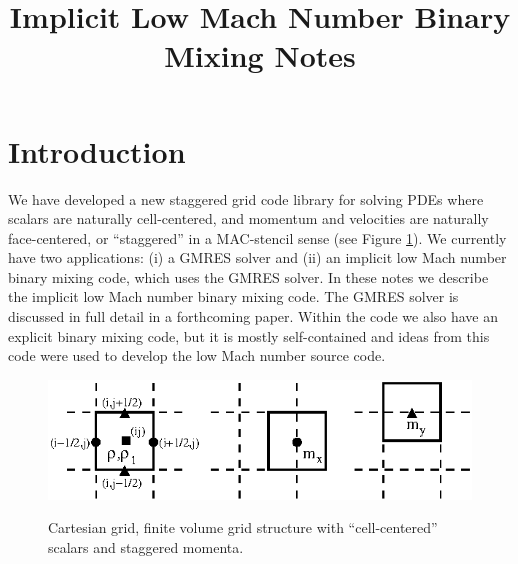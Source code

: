 \documentclass[final]{siamltex}
\begin{document}
\title{Implicit Low Mach Number Binary Mixing Notes}

\maketitle

\section{Introduction}
We have developed a new staggered grid code library for solving PDEs where scalars
are naturally cell-centered, and momentum and velocities are naturally face-centered,
or ``staggered'' in a MAC-stencil sense (see Figure \ref{fig:grid}).  We currently
have two applications: (i) a GMRES solver and (ii) an implicit low Mach number binary 
mixing code, which uses the GMRES solver.  In these notes we describe the implicit
low Mach number binary mixing code.  The GMRES solver is discussed in full detail 
in a forthcoming paper.  Within the code we also have an explicit binary mixing code,
but it is mostly self-contained and ideas from this code were used to develop the
low Mach number source code.
\begin{figure}[hb]
\centering
\includegraphics[width=5in]{grid}
\label{fig:grid}
\caption{Cartesian grid, finite volume grid structure with ``cell-centered'' scalars
and staggered momenta.}
\end{figure}
\end{document}

